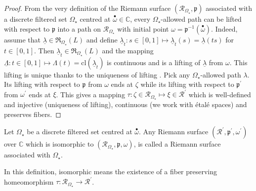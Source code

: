 \documentclass[11pt, english]{smfart}
\theoremstyle{definition}
\begin{document}
\begin{proof}
From the very definition of  the Riemann
surface  $(\mathscr{R}_{\Omega_\star}, \mathfrak{p})$ 
 associated with a  discrete filtered set $\Omega_\star$ centred
at ${ {\stackrel{\bullet}{\omega}} } \in \mathbb{C}$,  every $\Omega_\star$-allowed path can
be lifted with respect to  $\mathfrak{p}$ into a path on
$\mathscr{R}_{\Omega_\star}$ with initial point $\omega =
\mathfrak{p}^{-1}({ {\stackrel{\bullet}{\omega}} })$. 
Indeed, assume that $\underline{\lambda} \in
\mathfrak{R}_{\Omega_\star}(L)$ and define $\underline{\lambda}_t : s \in
[0,1] \mapsto \underline{\lambda}_t(s) = \underline{\lambda}(ts)$ 
for $t \in [0,1]$. Then $\underline{\lambda}_t \in
\mathfrak{R}_{\Omega_\star}(L)$ and the mapping
$\underline{\Lambda} : 
t \in [0,1] \mapsto \Lambda(t) = \mathrm{cl}(\underline{\lambda}_t )$
is continuous and is a lifting of $\underline{\lambda}$ from
$\omega$. 
This lifting is unique thanks to the uniqueness of
lifting \cite{For}. Pick any $\Omega_\star$-allowed path
$\lambda$. Its lifting with respect to $\mathfrak{p}$ from $\omega$
ends at $\zeta$ while its lifting with respect to
$\mathfrak{p}^\prime$ from $\omega^\prime$ ends at $\xi$. This gives a
mapping $\tau : \zeta \in \mathscr{R}_{\Omega_\star} \mapsto \xi \in
\mathscr{R}^\prime$ which is  well-defined and injective (uniqueness
of lifting), continuous (we work with \'etal\'e spaces) and preserves fibers.
\end{proof}

\begin{defi}\label{DFS-RS}
Let $\Omega_\star$ be a   discrete filtered set centred at
${ {\stackrel{\bullet}{\omega}} }$. Any Riemann surface $(\mathscr{R}^\prime,
\mathfrak{p}^\prime, \omega^\prime)$ over
$\mathbb{C}$ which is isomorphic to $(\mathscr{R}_{\Omega_\star},
\mathfrak{p}, \omega)$, is called
 a Riemann surface associated with $\Omega_\star$.
\end{defi}

In this definition, isomorphic means the existence of a fiber preserving
homeomorphism $\tau: \mathscr{R}_{\Omega_\star} \to \mathscr{R}^\prime$.
\end{document}
